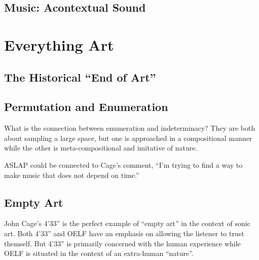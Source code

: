 \documentclass{thesis}
\begin{document}
\section{Music: Acontextual Sound}
	\cite{Bruen04}\cite{Vannort06}\cite{Attali85}\cite{Cage61}\cite{Sangild04}\cite{Cascone00}
	\cite{Hegarty02}\cite{Kahn01}\cite{Russolo04}
	
\chapter{Everything Art}
\section{The Historical ``End of Art''}
	\cite{Wright09}\cite{moma_kazimir_2006}\cite{moma_rodchenko_1998}
\section{Permutation and Enumeration}
	\cite{boolos_computability_2002}\cite{borges_aleph_2004}\cite{borges_library_2000}
	\cite{christian_scheib_statics_????}\cite{jim_campbell_end_1996}\cite{john_f._simon_jr._every_????}
	\cite{john_f._simon_jr._given:32_1997}\cite{kyle_mcdonald_nandhopper_2008}\cite{kyle_mcdonald_pppd_2009}
	\cite{leander_seige_imagen_????}\cite{leonardo_solaas_magic_????}\cite{matthew_mirapaul_in_1997}
	\cite{michael_aschauer_8-bit_????}\cite{nattiez_music_1990}\cite{remko_scha_every_2001}\cite{sintron_gods_2003}
	\cite{tomczak_all_2009}\cite{tomczak_hardware-based_2009}\cite{alexander_christiaan_jacob_allrgb_2008}
	\cite{allan_mccollum_shapes_2006}\cite{jem_finer_longplayer_????}\cite{john_cage_as_????}\cite{paul_slocum_pi_2007}
	\cite{brian_whitman_eigenradio_2005}\cite{keith_f._lynch_converting_????}
	\cite{tom_johnson_liner_1999}
	
	What is the connection between enumeration and indeterminacy? They are both about sampling a large space, but one is approached in a compositional manner while the other is meta-compositional and imitative of nature.
	
	ASLAP could be connected to Cage's comment, ``I'm trying to find a way to make music that does not depend on time.''
	
\section{Empty Art}

	\cite{larry_j_solomon_sounds_1998}
	John Cage's 4'33'' is the perfect example of ``empty art'' in the context of sonic art. Both 4'33'' and OELF have an emphasis on allowing the listener to trust themself. But 4'33'' is primarily concerned with the human experience while OELF is situated in the context of an extra-human ``nature''.
	
\end{document}
